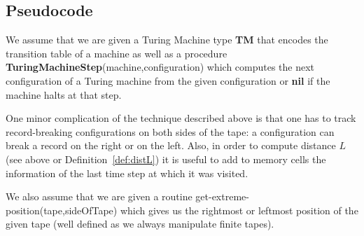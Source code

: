\subsection{Pseudocode}

We assume that we are given a Turing Machine type \textbf{TM} that encodes the transition table of a machine as well as a procedure \textbf{TuringMachineStep}(machine,configuration) which computes the next configuration of a Turing machine from the given configuration or \textbf{nil} if the machine halts at that step.

One minor complication of the technique described above is that one has to track record-breaking configurations on both sides of the tape: a configuration can break a record on the right or on the left. Also, in order to compute distance $L$ (see above or Definition~\ref{def:distL}) it is useful to add to memory cells the information of the last time step at which it was visited.

We also assume that we are given a routine {\sc get-extreme-position}(tape,sideOfTape) which gives us the rightmost or leftmost position of the given tape (well defined as we always manipulate finite tapes).

